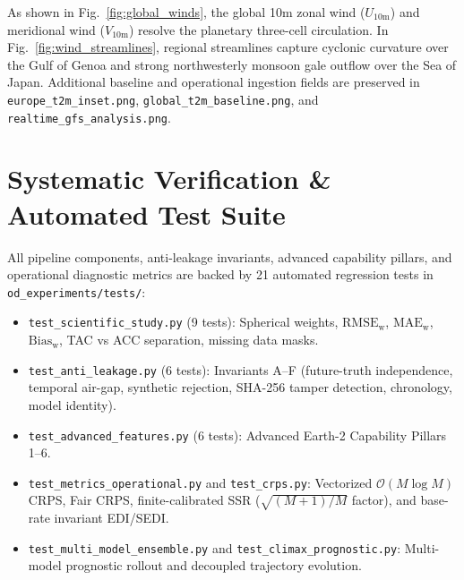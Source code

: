 \documentclass[10pt,twocolumn,letterpaper]{article}
\begin{document}
As shown in Fig.~\ref{fig:global_winds}, the global 10m zonal wind ($U_{10\mathrm{m}}$) and meridional wind ($V_{10\mathrm{m}}$) resolve the planetary three-cell circulation. In Fig.~\ref{fig:wind_streamlines}, regional streamlines capture cyclonic curvature over the Gulf of Genoa and strong northwesterly monsoon gale outflow over the Sea of Japan. Additional baseline and operational ingestion fields are preserved in \texttt{europe\_t2m\_inset.png}, \texttt{global\_t2m\_baseline.png}, and \texttt{realtime\_gfs\_analysis.png}.

\section{Systematic Verification \& Automated Test Suite}

All pipeline components, anti-leakage invariants, advanced capability pillars, and operational diagnostic metrics are backed by 21 automated regression tests in \texttt{od\_experiments/tests/}:
\begin{itemize}
    \item \texttt{test\_scientific\_study.py} (9 tests): Spherical weights, $\mathrm{RMSE}_\mathrm{w}$, $\mathrm{MAE}_\mathrm{w}$, $\mathrm{Bias}_\mathrm{w}$, TAC vs ACC separation, missing data masks.
    \item \texttt{test\_anti\_leakage.py} (6 tests): Invariants A--F (future-truth independence, temporal air-gap, synthetic rejection, SHA-256 tamper detection, chronology, model identity).
    \item \texttt{test\_advanced\_features.py} (6 tests): Advanced Earth-2 Capability Pillars 1--6.
    \item \texttt{test\_metrics\_operational.py} and \texttt{test\_crps.py}: Vectorized $\mathcal{O}(M \log M)$ CRPS, Fair CRPS, finite-calibrated SSR ($\sqrt{(M+1)/M}$ factor), and base-rate invariant EDI/SEDI.
    \item \texttt{test\_multi\_model\_ensemble.py} and \texttt{test\_climax\_prognostic.py}: Multi-model prognostic rollout and decoupled trajectory evolution.
\end{itemize}
\end{document}

